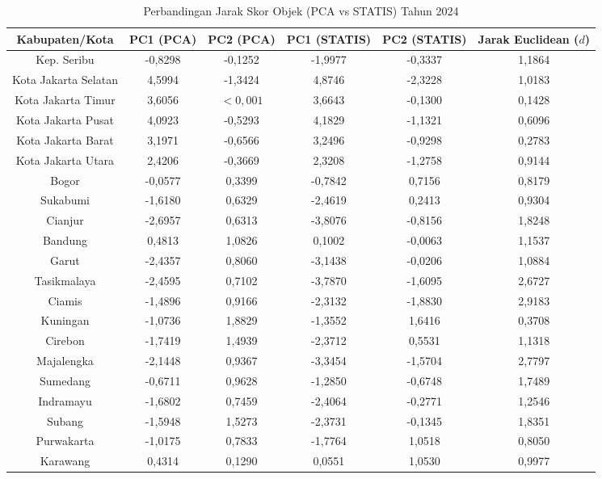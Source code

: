 \begin{table}[H]
\centering
\caption{Perbandingan Jarak Skor Objek (PCA vs STATIS) Tahun 2024} \label{tab:app1jarak_skor_2024}
\begin{adjustbox}{max width=\textwidth, max height=0.85\textheight}
\begin{tabular}{|c|c|c|c|c|c|}
\hline
\textbf{Kabupaten/Kota} & \textbf{PC1 (PCA)} & \textbf{PC2 (PCA)} & \textbf{PC1 (STATIS)} & \textbf{PC2 (STATIS)} & \textbf{Jarak Euclidean ($d$)} \\
\hline
Kep. Seribu & -0,8298 & -0,1252 & -1,9977 & -0,3337 & 1,1864 \\
Kota Jakarta Selatan & 4,5994 & -1,3424 & 4,8746 & -2,3228 & 1,0183 \\
Kota Jakarta Timur & 3,6056 & $< 0,001$ & 3,6643 & -0,1300 & 0,1428 \\
Kota Jakarta Pusat & 4,0923 & -0,5293 & 4,1829 & -1,1321 & 0,6096 \\
Kota Jakarta Barat & 3,1971 & -0,6566 & 3,2496 & -0,9298 & 0,2783 \\
Kota Jakarta Utara & 2,4206 & -0,3669 & 2,3208 & -1,2758 & 0,9144 \\
Bogor & -0,0577 & 0,3399 & -0,7842 & 0,7156 & 0,8179 \\
Sukabumi & -1,6180 & 0,6329 & -2,4619 & 0,2413 & 0,9304 \\
Cianjur & -2,6957 & 0,6313 & -3,8076 & -0,8156 & 1,8248 \\
Bandung & 0,4813 & 1,0826 & 0,1002 & -0,0063 & 1,1537 \\
Garut & -2,4357 & 0,8060 & -3,1438 & -0,0206 & 1,0884 \\
Tasikmalaya & -2,4595 & 0,7102 & -3,7870 & -1,6095 & 2,6727 \\
Ciamis & -1,4896 & 0,9166 & -2,3132 & -1,8830 & 2,9183 \\
Kuningan & -1,0736 & 1,8829 & -1,3552 & 1,6416 & 0,3708 \\
Cirebon & -1,7419 & 1,4939 & -2,3712 & 0,5531 & 1,1318 \\
Majalengka & -2,1448 & 0,9367 & -3,3454 & -1,5704 & 2,7797 \\
Sumedang & -0,6711 & 0,9628 & -1,2850 & -0,6748 & 1,7489 \\
Indramayu & -1,6802 & 0,7459 & -2,4064 & -0,2771 & 1,2546 \\
Subang & -1,5948 & 1,5273 & -2,3731 & -0,1345 & 1,8351 \\
Purwakarta & -1,0175 & 0,7833 & -1,7764 & 1,0518 & 0,8050 \\
Karawang & 0,4314 & 0,1290 & 0,0551 & 1,0530 & 0,9977 \\

\end{tabular}
\end{adjustbox}
\end{table}
